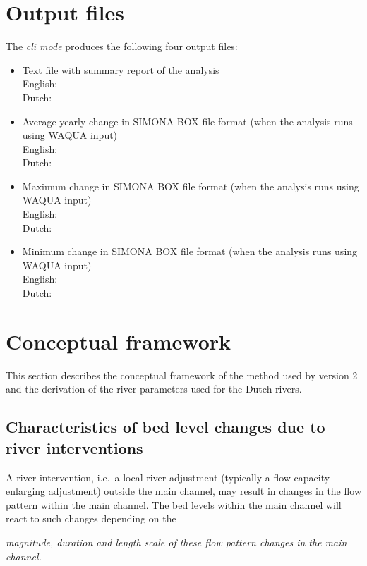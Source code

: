 \section{Output files}

The \emph{cli mode} produces the following four output files:

\begin{itemize}
\item Text file with summary report of the analysis \\
English:  \\
Dutch: 
\item Average yearly change in SIMONA BOX file format (when the analysis runs using WAQUA input) \\
English:  \\
Dutch: 
\item Maximum change in SIMONA BOX file format (when the analysis runs using WAQUA input) \\
English:  \\
Dutch: 
\item Minimum change in SIMONA BOX file format (when the analysis runs using WAQUA input) \\
English:  \\
Dutch: 
\end{itemize}

\section{Conceptual framework}

This section describes the conceptual framework of the method used by \dfastmi version 2 and the derivation of the river parameters used for the Dutch rivers.

\subsection{Characteristics of bed level changes due to river interventions}

A river intervention, i.e.~a local river adjustment (typically a flow capacity enlarging adjustment) outside the main channel, may result in changes in the flow pattern within the main channel.
The bed levels within the main channel will react to such changes depending on the

\hspace{1cm}\emph{magnitude, duration and length scale of these flow pattern changes in the main channel.}

